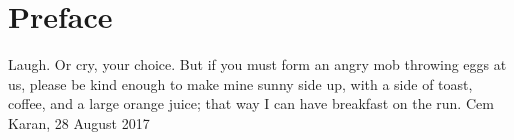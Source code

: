 
\chapter*{Preface}

Laugh.  Or cry, your choice.  But if you must form an angry mob throwing eggs at
us, please be kind enough to make mine sunny side up, with a side of toast,
coffee, and a large orange juice; that way I can have breakfast on the run. \newline
\hspace*{\fill}Cem Karan, 28 August 2017
